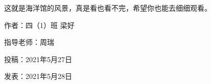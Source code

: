 这就是海洋馆的风景，真是看也看不完，希望你也能去细细观看。





\vspace{10pt}



作者：四（1）班 梁好



指导老师：周瑞



投稿：2021年5月27日



发表：2021年5月28日












                



\vspace{10pt}

\hline



